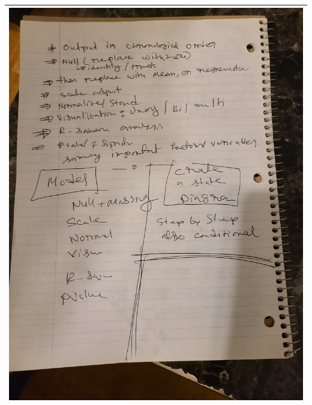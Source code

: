 \begin{tabular}{|c|}
\includegraphics[scale=0.1, angle = -90]{sketch/2.jpg} \\
\hline
\end{tabular}

